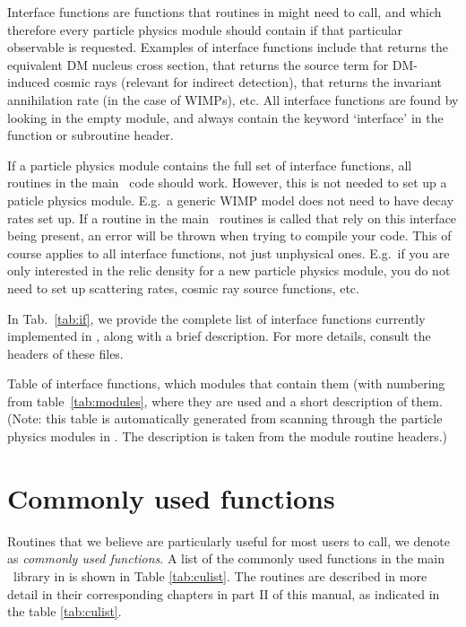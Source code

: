  Interface functions are functions that routines in  might need to call, and
which therefore every particle physics module should contain if that particular observable is requested. 
Examples of interface functions include  that returns the equivalent DM nucleus cross section,  that 
returns the source term for DM-induced cosmic rays (relevant for indirect detection),
 that returns the invariant annihilation rate (in the case of WIMPs), etc.
 All interface functions are found by looking in the empty module, and always contain the 
 keyword `interface' in the function or subroutine header.

If a particle physics module contains the full set of interface functions, all
routines in the main \ds\ code should work. However, this is not needed to set up a paticle physics module. E.g.\ a generic WIMP model does not need to have decay rates set up. If a routine in the main \ds\ routines is called that rely on this interface being present, an error will be thrown when trying to compile your code. This of course applies to all interface functions, not just unphysical ones. E.g.\ if you are only interested in the relic density for a new particle physics module, you do not need to set up scattering rates, cosmic ray source functions, etc.

In Tab.~\ref{tab:if}, we provide the complete list of interface functions currently implemented in \ds,
along with a brief description. For more details, consult the headers of these files.

\bigskip

\begin{table}[!h]
[IFLIST]
\caption{Table of interface functions, which modules that contain them (with numbering from table~\ref{tab:modules}, where they are used and a short description of them. (Note: this table is automatically generated from scanning through the particle physics modules in . The description is taken from the  module routine headers.)}
\label{tab:if}
\end{table}


\section{Commonly used functions}

Routines that we believe are particularly  useful for most users to call, we denote 
as \emph{commonly used functions}. A list of the commonly used functions in the main \ds\ library in  is 
shown in Table \ref{tab:culist}. The routines are described in more detail in their corresponding chapters in part II of 
this manual, as indicated in the table \ref{tab:culist}. 

